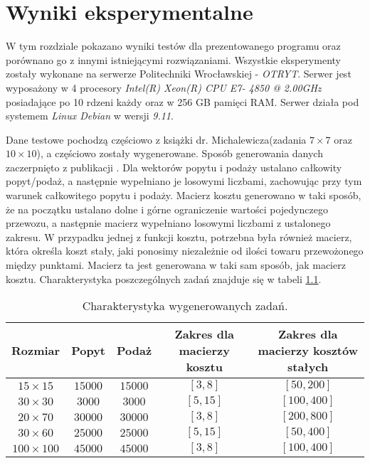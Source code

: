 \chapter{Wyniki eksperymentalne}
\thispagestyle{chapterBeginStyle}

W tym rozdziale pokazano wyniki testów dla prezentowanego programu oraz porównano go z innymi istniejącymi rozwiązaniami. 
Wszystkie eksperymenty zostały wykonane na serwerze Politechniki Wrocławskiej - \textit{OTRYT}. Serwer jest wyposażony w 4 procesory 
\textit{Intel(R) Xeon(R) CPU E7- 4850  @ 2.00GHz} posiadające po 10 rdzeni każdy oraz w 256 GB pamięci RAM. Serwer działa pod systemem 
\textit{Linux Debian} w wersji \textit{9.11}.

Dane testowe pochodzą częściowo z książki dr. Michalewicza(zadania $7 \times 7$ oraz $10 \times 10$)\cite{ALG-GEN-BOOK}, a częściowo 
zostały wygenerowane. Sposób generowania danych zaczerpnięto z publikacji \cite{GEN-TEST-DATA}. Dla wektorów popytu i podaży ustalano 
całkowity popyt/podaż, a następnie wypełniano je losowymi liczbami, zachowując przy tym warunek całkowitego popytu i podaży. 
Macierz kosztu generowano w taki sposób, że na początku ustalano dolne i górne ograniczenie wartości pojedynczego przewozu, a następnie 
macierz wypełniano losowymi liczbami z ustalonego zakresu. W przypadku jednej z funkcji kosztu, potrzebna była również macierz, która 
określa koszt stały, jaki ponosimy niezależnie od ilości towaru przewożonego między punktami. Macierz ta jest generowana w taki sam 
sposób, jak macierz kosztu. Charakterystyka poszczególnych zadań znajduje się w tabeli \ref{specyfika-zadan}.

\begin{table}[H]
    \begin{center}
        \begin{tabular}{c|c|c|c|c}
            Rozmiar & Popyt & Podaż & Zakres dla macierzy kosztu & Zakres dla macierzy kosztów stałych \\ 
            \hline
            $15 \times 15$ & $15000$ & $15000$ & $[3, 8]$ & $[50, 200]$ \\
            $30 \times 30$ & $3000$ & $3000$ & $[5, 15]$ & $[100, 400]$ \\
            $20 \times 70$ & $30000$ & $30000$ & $[3, 8]$ & $[200, 800]$ \\
            $30 \times 60$ & $25000$ & $25000$ & $[5, 15]$ & $[50, 400]$ \\
            $100 \times 100$ & $45000$ & $45000$ & $[3, 8]$ & $[100, 400]$ \\
        \end{tabular}
    \end{center}
    \caption{Charakterystyka wygenerowanych zadań.}
    \label{specyfika-zadan}
\end{table}

